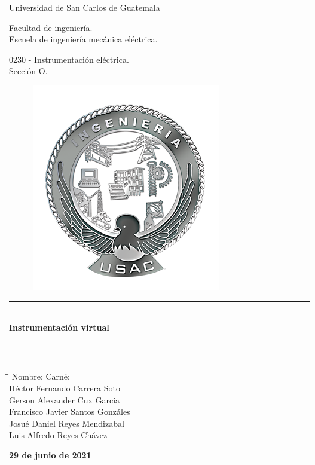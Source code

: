 \newcommand{\HRule}{\rule{\linewidth}{0.2mm}}

\begin{titlepage}
\begin{center}

\vspace{0.5cm}

{\Huge Universidad de San Carlos de Guatemala}

\vspace{1cm}


{\large Facultad de ingeniería.}\\
{\large Escuela de ingeniería mecánica eléctrica.}


\vspace{0.5cm}


0230 - Instrumentación eléctrica.\\
Sección O.


\vspace{0.5cm}

\begin{figure}[h]
\centering
\includegraphics[scale=0.8]{logo-fiusac.png}
\end{figure}

\vspace{0.5cm}

		
\HRule \\[0.4cm]
{ \huge \bfseries Instrumentación virtual
}\\[0.4cm]
\HRule \\[1.5cm]

\begin{tabbing}
\hspace{4cm}\=\hspace{7.5cm}\=\kill
\>  Nombre: \> Carné:\\
 \>  Héctor Fernando Carrera Soto  \\ 
 \>  Gerson Alexander Cux Garcia  \\ 
 \>  Francisco Javier Santos Gonzáles  \\ 
 \>  Josué Daniel Reyes Mendizabal  \\ 
 \>  Luis Alfredo Reyes Chávez 
\end{tabbing}  

\vspace{0.5cm}

\textbf{{\large 29 de junio de 2021}}
		
\end{center}
\end{titlepage}